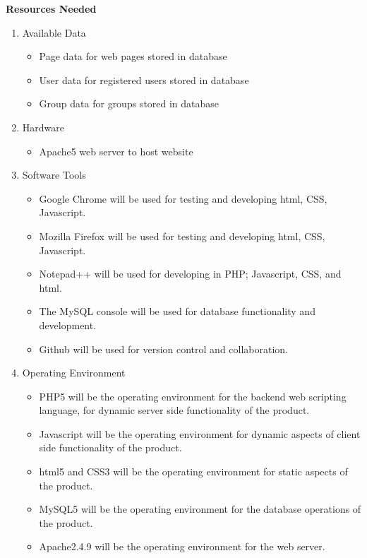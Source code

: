 \documentclass[11pt]{article}
\begin{document}
\vspace{10 mm}



\textbf{Resources Needed}

\begin{enumerate}
    \item Available Data
    
    \begin{itemize}
    \item Page data for web pages stored in database
    \item User data for registered users stored in database
    \item Group data for groups stored in database
    \end{itemize}
    
    \item Hardware
    
    \begin{itemize}
    \item Apache5 web server to host website 
    \end{itemize}
    
    \item Software Tools
    
    \begin{itemize}
    \item Google Chrome will be used for testing and developing html, CSS, Javascript.
    \item Mozilla Firefox will be used for testing and developing html, CSS, Javascript.
    \item Notepad++ will be used for developing in PHP; Javascript, CSS, and html.
    \item The MySQL console will be used for database functionality and development.
    \item Github will be used for version control and collaboration.
    \end{itemize}
    
    \item Operating Environment
    
    \begin{itemize}
    \item PHP5 will be the operating environment for the backend web scripting language, for dynamic server side functionality of the product.
    \item Javascript will be the operating environment for dynamic aspects of client side functionality of the product.
    \item html5 and CSS3 will be the operating environment for static aspects of the product.
    \item MySQL5 will be the operating environment for the database operations of the product.
    \item Apache2.4.9 will be the operating environment for the web server.
    \end{itemize}
    
    \end{enumerate}
    
\end{document}
